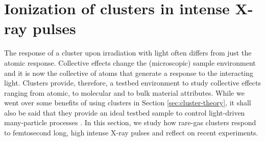 \section{Ionization of clusters in intense X-ray pulses}\label{sec:ionizatin-of-ext-obj}
The response of a cluster upon irradiation with light often differs from just the atomic response. Collective effects change the (microscopic) sample environment and it is now the collective of atoms that generate a response to the interacting light. Clusters provide, therefore, a testbed environment to study collective effects ranging from atomic, to molecular and to bulk material attributes. While we went over some benefits of using clusters in Section \ref{sec:cluster-theory}, it shall also be said that they provide an ideal testbed sample to control light-driven many-particle processes \citep{Fennel-2010-RMP}. In this section, we study how rare-gas clusters respond to femtosecond long, high intense X-ray pulses and reflect on recent experiments.
%
%
%
